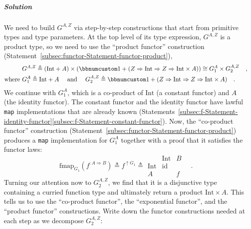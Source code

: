 \subparagraph{Solution}

We need to build $G^{A,Z}$ via step-by-step constructions that start
from primitive types and type parameters. At the top level of its
type expression, $G^{A,Z}$ is a product type, so we need to use the
``product functor'' construction (Statement~\ref{subsec:functor-Statement-functor-product}),
\begin{align*}
 & G^{A,Z}\triangleq(\text{Int}+A)\times(\bbnum 1+(Z\Rightarrow\text{Int}\Rightarrow Z\Rightarrow\text{Int}\times A))\cong G_{1}^{A}\times G_{2}^{A,Z}\quad,\\
\text{where } & G_{1}^{A}\triangleq\text{Int}+A\quad\text{ and }\quad G_{2}^{A,Z}\triangleq\bbnum 1+(Z\Rightarrow\text{Int}\Rightarrow Z\Rightarrow\text{Int}\times A)\quad.
\end{align*}
We continue with $G_{1}^{A}$, which is a co-product of $\text{Int}$
(a constant functor) and $A$ (the identity functor). The constant
functor and the identity functor have lawful \lstinline!map! implementations
that are already known (Statements~\ref{subsec:f-Statement-identity-functor}\textendash \ref{subsec:f-Statement-constant-functor}).
Now, the ``co-product functor'' construction (Statement~\ref{subsec:functor-Statement-functor-product})
produces a \lstinline!map! implementation for $G_{1}^{A}$ together
with a proof that it satisfies the functor laws:
\[
\text{fmap}_{G_{1}}(f^{:A\Rightarrow B})\triangleq f^{\uparrow G_{1}}\triangleq\begin{array}{|c||cc|}
 & \text{Int} & B\\
\hline \text{Int} & \text{id} & \\
A &  & f
\end{array}\quad.
\]
Turning our attention now to $G_{2}^{A,Z}$, we find that it is a
disjunctive type containing a curried function type and ultimately
return a product $\text{Int}\times A$. This tells us to use the ``co-product
functor'', the ``exponential functor'', and the ``product functor''
constructions. Write down the functor constructions needed at each
step as we decompose $G_{2}^{A,Z}$:
